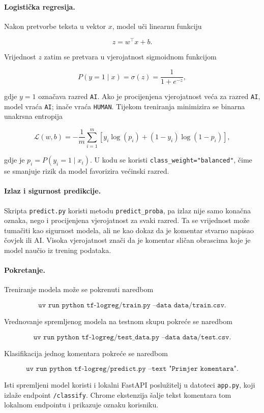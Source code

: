 \documentclass{article}
\begin{document}
\paragraph{Logistička regresija.}
Nakon pretvorbe teksta u vektor $x$, model uči linearnu funkciju

\[
z=w^\top x+b.
\]

Vrijednost $z$ zatim se pretvara u vjerojatnost sigmoidnom funkcijom

\[
P(y=1\mid x)=\sigma(z)=\frac{1}{1+e^{-z}},
\]

gdje $y=1$ označava razred \texttt{AI}. Ako je procijenjena vjerojatnost veća za razred \texttt{AI}, model vraća \texttt{AI}; inače vraća \texttt{HUMAN}. Tijekom treniranja minimizira se binarna unakrsna entropija

\[
\mathcal{L}(w,b)=-\frac{1}{m}\sum_{i=1}^{m}\left[y_i\log(p_i)+(1-y_i)\log(1-p_i)\right],
\]

gdje je $p_i=P(y_i=1\mid x_i)$. U kodu se koristi \texttt{class\_weight="balanced"}, čime se smanjuje rizik da model favorizira većinski razred.

\paragraph{Izlaz i sigurnost predikcije.}
Skripta \texttt{predict.py} koristi metodu \texttt{predict\_proba}, pa izlaz nije samo konačna oznaka, nego i procijenjena vjerojatnost za svaki razred. Ta se vrijednost može tumačiti kao sigurnost modela, ali ne kao dokaz da je komentar stvarno napisao čovjek ili AI. Visoka vjerojatnost znači da je komentar sličan obrascima koje je model naučio iz trening podataka.

\paragraph{Pokretanje.}
Treniranje modela može se pokrenuti naredbom

\[
\texttt{uv run python tf-logreg/train.py --data data/train.csv}.
\]

Vrednovanje spremljenog modela na testnom skupu pokreće se naredbom

\[
\texttt{uv run python tf-logreg/test\_data.py --data data/test.csv}.
\]

Klasifikacija jednog komentara pokreće se naredbom

\[
\texttt{uv run python tf-logreg/predict.py --text "Primjer komentara"}.
\]

Isti spremljeni model koristi i lokalni FastAPI poslužitelj u datoteci \texttt{app.py}, koji izlaže endpoint \texttt{/classify}. Chrome ekstenzija šalje tekst komentara tom lokalnom endpointu i prikazuje oznaku korisniku.
\end{document}
